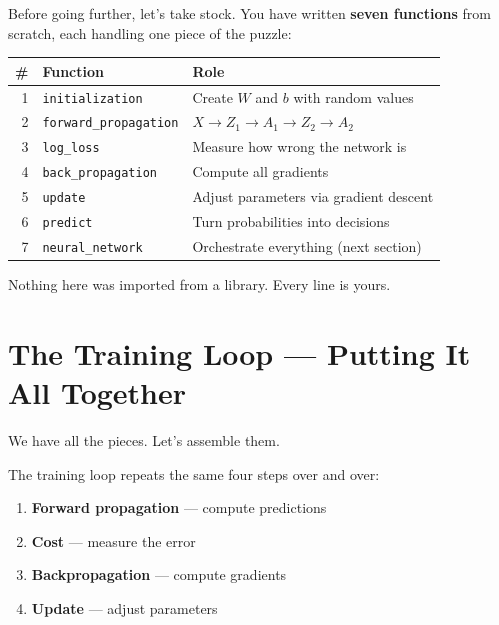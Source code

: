 \documentclass[11pt]{article}
\begin{document}
\begin{recapbox}[title=Checkpoint --- Your Toolkit So Far]
Before going further, let's take stock.
You have written \textbf{seven functions} from scratch, each handling one piece of the puzzle:

\begin{center}
\renewcommand{\arraystretch}{1.3}
\begin{tabular}{r l l}
\textbf{\#} & \textbf{Function} & \textbf{Role} \\
\hline
1 & \texttt{initialization} & Create $W$ and $b$ with random values \\
2 & \texttt{forward\_propagation} & $X \to Z_1 \to A_1 \to Z_2 \to A_2$ \\
3 & \texttt{log\_loss} & Measure how wrong the network is \\
4 & \texttt{back\_propagation} & Compute all gradients \\
5 & \texttt{update} & Adjust parameters via gradient descent \\
6 & \texttt{predict} & Turn probabilities into decisions \\
7 & \texttt{neural\_network} & Orchestrate everything (next section) \\
\end{tabular}
\end{center}

Nothing here was imported from a library. Every line is yours.
\end{recapbox}

\section{The Training Loop --- Putting It All Together}

We have all the pieces. Let's assemble them.

The training loop repeats the same four steps over and over:

\begin{enumerate}
  \item \textbf{Forward propagation} --- compute predictions
  \item \textbf{Cost} --- measure the error
  \item \textbf{Backpropagation} --- compute gradients
  \item \textbf{Update} --- adjust parameters
\end{enumerate}
\end{document}

